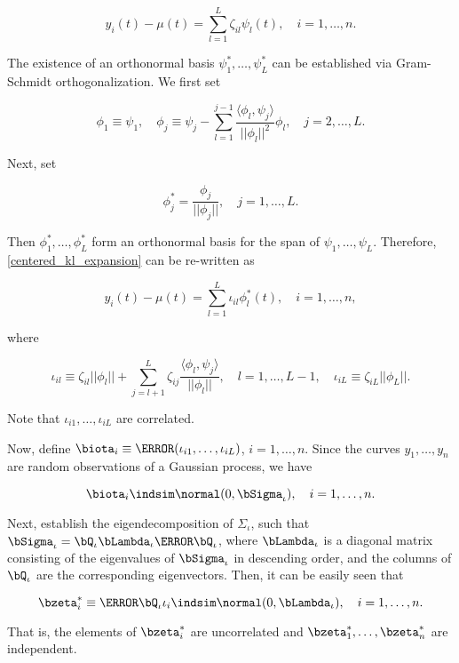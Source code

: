 \documentclass[12pt]{article}
\theoremstyle{plain}
\theoremstyle{definition}
\theoremstyle{remark}
\begin{document}
\begin{equation}
	y_i (t) - \mu (t) = \sum_{l=1}^L \zeta_{il} \psi_l (t), \quad i = 1, \dots, n.
\label{centered_kl_expansion}
\end{equation}

\noindent The existence of an orthonormal basis $\psi^*_1, \dots, \psi^*_L$ can be established via Gram-Schmidt
orthogonalization. We first set

\[
	\phi_1 \equiv \psi_1, \quad
	\phi_j \equiv \psi_j - \sum_{l=1}^{j-1} \frac{\langle \phi_l, \psi_j \rangle}{|| \phi_l ||^2} \phi_l, \quad j = 2, \dots, L.
\]

\noindent Next, set

\[
	\phi^*_j = \frac{\phi_j}{|| \phi_j ||}, \quad j = 1, \dots, L.
\]

\noindent Then $\phi^*_1, \dots, \phi^*_L$ form an orthonormal basis for the span of $\psi_1, \dots, \psi_L$. Therefore,
\eqref{centered_kl_expansion} can be re-written as

\[
	y_i (t) - \mu (t) = \sum_{l=1}^L \iota_{il} \phi^*_l (t), \quad i = 1, \dots, n,
\]

\noindent where

\[
	\iota_{il} \equiv \zeta_{il} ||\phi_l|| + \sum_{j=l+1}^L \zeta_{ij} \frac{\langle \phi_l , \psi_j \rangle}{||\phi_l||}, \quad
	l = 1, \dots, L-1, \quad
	\iota_{iL} \equiv \zeta_{iL} ||\phi_L||.
\]

\noindent Note that $\iota_{i1}, \dots, \iota_{iL}$ are correlated.

Now, define $\biota_i \equiv \T{(\iota_{i1}, \dots, \iota_{iL})}$, $i = 1, \dots, n$. Since the curves $y_1, \dots, y_n$ are
random observations of a Gaussian process, we have

\[
	\biota_i \indsim \normal (0, \bSigma_\iota), \quad i = 1, \dots, n.
\]

\noindent Next, establish the eigendecomposition of $\Sigma_\iota$, such
that $\bSigma_\iota = \bQ_\iota \bLambda_\iota \T{\bQ_\iota}$, where $\bLambda_\iota$
is a diagonal matrix consisting of the eigenvalues of
$\bSigma_\iota$ in descending order, and the columns of $\bQ_\iota$
are the corresponding eigenvectors. Then, it can be easily seen that

\[
	\bzeta^*_i \equiv \T{\bQ_\iota} \iota_i \indsim \normal (0, \bLambda_\iota), \quad i = 1, \dots, n.
\]

\noindent That is, the elements of $\bzeta^*_i$ are uncorrelated and $\bzeta^*_1, \dots, \bzeta^*_n$ are independent.
\end{document}
